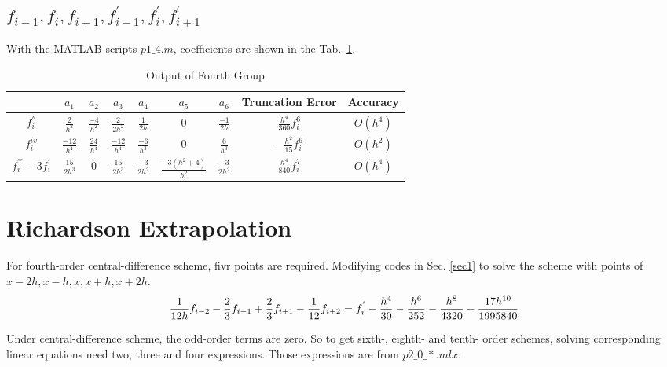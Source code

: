 \documentclass[letterpaper,10pt]{article}
\begin{document}
\subsection{$f_{i-1},f_{i},f_{i+1},f_{i-1}^{'},f_{i}^{'},f_{i+1}^{'}$}
With the MATLAB scripts $p1\_4.m$, coefficients are shown in the Tab.~\ref{tab1_4}. 
\begin{table}[htbp]
  \centering  
  \caption{Output of Fourth Group}\label{tab1_4}
  \begin{tabular}{ccccccccc}
    \hline
    & $a_1$ & $a_2$ & $a_3$ & $a_4$& $a_5$ & $a_6$& Truncation Error& Accuracy\\
    \hline
    $f_{i}^{''}$ & $\frac{2}{h^2}$ & $\frac{-4}{h^2}$ & $\frac{2}{2h^2}$ & $\frac{1}{2h}$ &0& $\frac{-1}{2h}$ & $\frac{h^4}{360}f_{i}^{6}$& $O\left(h^4\right)$\\
    $f_{i}^{iv}$ & $\frac{-12}{h^4}$ & $\frac{24}{h^4}$ & $\frac{-12}{h^4}$ & $\frac{-6}{h^3}$ &0& $\frac{6}{h^3}$ & $-\frac{h^2}{15}f_{i}^{6}$& $O\left(h^2\right)$\\
    $f_{i}^{'''}-3f_{i}^{'}$ & $\frac{15}{2h^3}$ & $0$ & $\frac{15}{2h^3}$ & $\frac{-3}{2h^2}$ & $\frac{-3\left(h^2+4\right)}{h^2}$ & $\frac{-3}{2h^2}$&$\frac{h^4}{840}f_{i}^{7}$&$O\left(h^4\right)$\\
    \hline
  \end{tabular}
\end{table}

\section{Richardson Extrapolation}
For fourth-order central-difference scheme, fivr points are required. Modifying codes in Sec. \ref{sec1} to solve 
the scheme with points of $x-2h, x-h, x, x+h, x+2h$. 
\begin{equation}
  \frac{1}{12h}f_{i-2}-\frac{2}{3}f_{i-1}+\frac{2}{3}f_{i+1}-\frac{1}{12}f_{i+2}
  = f_{i}^{'} - \frac{h^4}{30} - \frac{h^6}{252} - \frac{h^8}{4320} - \frac{17h^{10}}{1995840} \notag
\end{equation}

Under central-difference scheme, the odd-order terms are zero. So to get sixth-, eighth- and tenth- order
schemes, solving corresponding linear equations need two, three and four expressions. Those expressions are 
from $p2\_0\_*.mlx$. 
\end{document}
